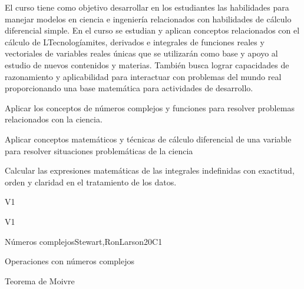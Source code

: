 \begin{syllabus}


\begin{justification}
El curso tiene como objetivo desarrollar en los estudiantes las habilidades para manejar modelos en ciencia e ingeniería relacionados con habilidades de cálculo diferencial simple. En el curso se estudian y aplican conceptos relacionados con el cálculo de LTecnologíamites, derivados e integrales de funciones reales y vectoriales de variables reales únicas que se utilizarán como base y
apoyo al estudio de nuevos contenidos y materias. También busca lograr capacidades de razonamiento y aplicabilidad para interactuar con problemas del mundo real proporcionando una base matemática para actividades de desarrollo.
\end{justification}

\begin{goals}
\item Aplicar los conceptos de números complejos y funciones para resolver problemas relacionados con la ciencia.
\item Aplicar conceptos matemáticos y técnicas de cálculo diferencial de una variable para resolver situaciones problemáticas de la ciencia
\item Calcular las expresiones matemáticas de las integrales indefinidas con exactitud, orden y claridad en el tratamiento de los datos.
\end{goals}

\begin{outcomes}{V1}
    \item {}
    \item {}
\end{outcomes}

\begin{competences}{V1}
    \item {}
    \item {}
    \item {}
\end{competences}

\begin{unit}{Números complejos}{}{Stewart,RonLarson}{20}{C1}
   \begin{topics}
    \item Operaciones con números complejos
    \item Teorema de Moivre 
   \end{topics}


\end{unit}
\end{syllabus}
